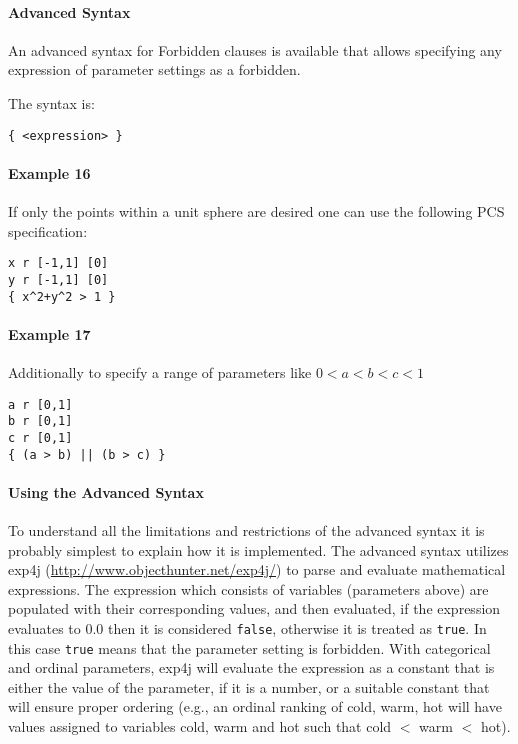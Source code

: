 \documentclass[manual.tex]{subfiles}
\begin{document}
\paragraph{Advanced Syntax}

An advanced syntax for Forbidden clauses is available that allows specifying any expression of parameter settings as a forbidden.

The syntax is:

\begin{verbatim}
{ <expression> }
\end{verbatim}

\paragraph{Example 16}
If only the points within a unit sphere are desired one can use the following PCS specification:

\begin{verbatim}
x r [-1,1] [0]
y r [-1,1] [0]
{ x^2+y^2 > 1 }
\end{verbatim}

\paragraph{Example 17}
Additionally to specify a range of parameters like $ 0 < a < b < c < 1 $

\begin{verbatim}
a r [0,1]
b r [0,1]
c r [0,1]
{ (a > b) || (b > c) }
\end{verbatim}


\paragraph{Using the Advanced Syntax}

To understand all the limitations and restrictions of the advanced syntax it is probably simplest to explain how it is implemented. The advanced syntax utilizes exp4j (\url{http://www.objecthunter.net/exp4j/}) to parse and evaluate mathematical expressions.  The expression which consists of variables (parameters above) are populated with their corresponding values, and then evaluated, if the expression evaluates to 0.0 then it is considered \texttt{false}, otherwise it is treated as \texttt{true}. In this case \texttt{true} means that the parameter setting is forbidden.  With categorical and ordinal parameters, exp4j will evaluate the expression as a constant that is either the value of the parameter, if it is a number, or a suitable constant that will ensure proper ordering (e.g., an ordinal ranking of cold, warm, hot will have values assigned to variables cold, warm and hot such that cold $<$ warm $<$ hot). 
\end{document}

